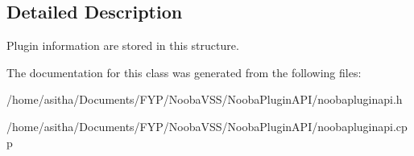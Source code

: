 \subsection{Detailed Description}
Plugin information are stored in this structure. 

The documentation for this class was generated from the following files\-:\begin{DoxyCompactItemize}
\item 
/home/asitha/\-Documents/\-F\-Y\-P/\-Nooba\-V\-S\-S/\-Nooba\-Plugin\-A\-P\-I/noobapluginapi.\-h\item 
/home/asitha/\-Documents/\-F\-Y\-P/\-Nooba\-V\-S\-S/\-Nooba\-Plugin\-A\-P\-I/noobapluginapi.\-cpp\end{DoxyCompactItemize}
